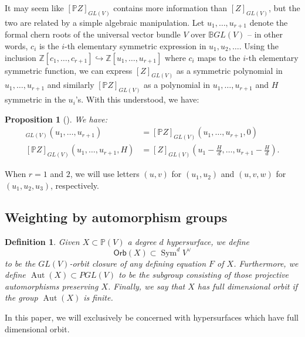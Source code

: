 \documentclass[12 pt, reqno]{amsart}
\newtheorem{prop}[thm]{Proposition}
\newtheorem{defn}[thm]{Definition}
\theoremstyle{definition}
\newcommand{\on}{\operatorname}
\newcommand{\mb}{\mathbb}
\newcommand{\Orb}{\mathsf{Orb}}
\begin{document}
It may seem like $[\mb{P}Z]_{GL(V)}$ contains more information than
$[Z]_{GL(V)}$, but the two are related by a simple algebraic
manipulation.  Let $u_1, \dots, u_{r+1}$ denote the formal chern roots
of the universal vector bundle $V$ over $\mathbb{B}GL(V)$ -- in other
words, $c_{i}$ is the $i$-th elementary symmetric expression in
$u_{1}, u_{2}, \dots$. Using the inclusion
$\mb{Z}[c_1,\ldots,c_{r+1}]\hookrightarrow \mb{Z}[u_1,\ldots,u_{r+1}]$
where $c_i$ maps to the $i$-th elementary symmetric function, we can
express $[Z]_{GL(V)}$ as a symmetric polynomial in
$u_1,\ldots,u_{r+1}$ and similarly $[\mb{P}Z]_{GL(V)}$ as a polynomial
in $u_1,\ldots,u_{r+1}$ and $H$ symmetric in the $u_i$'s.  With this
understood, we have:
\begin{prop}[{\cite[Theorem 6.1]{FNR05}}]
  \label{projectivethom}
  We have:
  \begin{align*}
    [Z]_{GL(V)}(u_1,\dots,u_{r+1})&=[\mb{P}Z]_{GL(V)}(u_1,\dots, u_{r+1},0)\\
    [\mb{P}Z]_{GL(V)}(u_1,\dots,u_{r+1},H)&= [Z]_{GL(V)}(u_{1}-\frac{H}{d},\dots,u_{r+1}-\frac{H}{d}).
  \end{align*}
\end{prop}

When $r=1$ and $2$, we will use letters $(u,v)$ for $(u_1,u_2)$ and
$(u,v,w)$ for $(u_1,u_2,u_3)$, respectively.



\subsection{Weighting by automorphism groups}
\label{sec:predegree}


\begin{defn}
  Given $X\subset \mathbb{P}(V)$ a degree $d$ hypersurface, we define
  $$\Orb (X)\subset \on{Sym}^dV^{\vee}$$ to be the $GL(V)$-orbit closure of any
  defining equation $F$ of $X$. Furthermore, we define
  $\on{Aut}(X) \subset PGL(V)$ to be the subgroup consisting of those
  projective automorphisms preserving $X$. Finally, we say that $X$
  has {\sl full dimensional orbit} if the group $\on{Aut}(X)$ is
  finite.
\end{defn}

In this paper, we will exclusively be concerned with hypersurfaces
which have full dimensional orbit.
\end{document}
